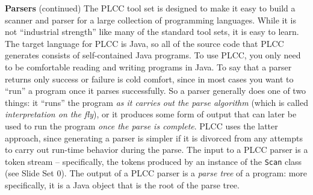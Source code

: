 \begin{minipage}[t]{\sw}
\slidenumber
\LARGE
{\bf Parsers} (continued)\exx
The PLCC tool set is designed
to make it easy to build a scanner and parser
for a large collection of programming languages.
While it is not ``industrial strength'' like many of the standard tool sets,
it is easy to learn.
The target language for PLCC is Java,
so all of the source code that PLCC generates
consists of self-contained Java programs.
To use PLCC, you only need to be comfortable
reading and writing programs in Java.\exx
To say that a parser returns only success or failure
is cold comfort,
since in most cases you want to ``run'' a program
once it parses successfully.
So a parser generally does one of two things:
it ``runs'' the program {\em as it carries out the parse algorithm}
(which is called {\em interpretation on the fly}),
or it produces some form of output
that can later be used to run the program {\em once the parse is complete}.
PLCC uses the latter approach,
since generating a parser is simpler
if it is divorced from any attempts to carry out
run-time behavior during the parse.\exx
The input to a PLCC parser is a token stream --
specifically, the tokens produced by an instance of the \verb'Scan' class
(see Slide Set 0).
The output of a PLCC parser is a {\em parse tree} of a program:
more specifically, it is a Java object
that is the root of the parse tree.
\end{minipage}
\clearpage
